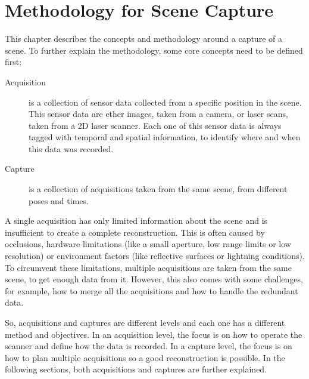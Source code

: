 \chapter{Methodology for Scene Capture}
\label{chapter:scene_capture_methodology}

This chapter describes the concepts and methodology around a capture of a scene. To further explain the methodology, some core concepts need to be defined first:

\begin{description}
    
    \item[Acquisition]
        is a collection of sensor data collected from a specific position in the scene. This sensor data are ether images, taken from a camera, or laser scans, taken from a 2D laser scanner. Each one of this sensor data is always tagged with temporal and spatial information, to identify where and when this data was recorded.
    
    \item[Capture]
        is a collection of acquisitions taken from the same scene, from different poses and times.

\end{description}

A single acquisition has only limited information about the scene and is insufficient to create a complete reconstruction. This is often caused by occlusions, hardware limitations (like a small aperture, low range limits or low resolution) or environment factors (like reflective surfaces or lightning conditions). To circumvent these limitations, multiple acquisitions are taken from the same scene, to get enough data from it. However, this also comes with some challenges, for example, how to merge all the acquisitions and how to handle the redundant data.

So, acquisitions and captures are different levels and each one has a different method and objectives. In an acquisition level, the focus is on how to operate the scanner and define how the data is recorded. In a capture level, the focus is on how to plan multiple acquisitions so a good reconstruction is possible. In the following sections, both acquisitions and captures are further explained.







